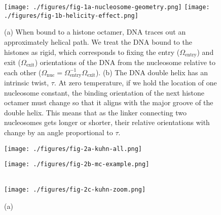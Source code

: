 \documentclass[%
 reprint,
superscriptaddress,
showpacs,preprintnumbers,
 amsmath,amssymb,
 aps,
 prl,
]{revtex4-1}
\begin{document}

\begin{figure}[t]
    \centering
    \texttt{[image: ./figures/fig-1a-nucleosome-geometry.png]}
    \texttt{[image: ./figures/fig-1b-helicity-effect.png]}
    \caption{(a) When bound to a histone octamer, DNA traces out an
    approximately helical path. We treat the DNA bound to the histones as rigid,
    which corresponds to fixing the entry ($\Omega_\text{entry}$) and exit
    ($\Omega_\text{exit}$) orientations of the DNA from the nucleosome relative
    to each other ($\Omega_\text{nuc} =
    \Omega_\text{entry}^{-1}\Omega_\text{exit}$).
    (b) The DNA double helix has an intrinsic twist, $\tau$. At zero
    temperature, if we hold the location of one nucleosome constant, the binding
    orientation of the next histone octamer must change so that it aligns with
    the major groove of the double helix. This means that as the linker
    connecting two nucleosomes gets longer or shorter, their relative
    orientations with change by an angle proportional to $\tau$.
    }\label{fig:nuc-geo}
\end{figure}

\begin{figure}[t]
    \centering
    \begin{minipage}{0.65\linewidth}
        \texttt{[image: ./figures/fig-2a-kuhn-all.png]}
    \end{minipage}
    \begin{minipage}{0.30\linewidth}
        \vfill
        \texttt{[image: ./figures/fig-2b-mc-example.png]}
        \vfill
    \end{minipage}
    \\
    \texttt{[image: ./figures/fig-2c-kuhn-zoom.png]}
    \caption{(a) }
\end{figure}
\end{document}
